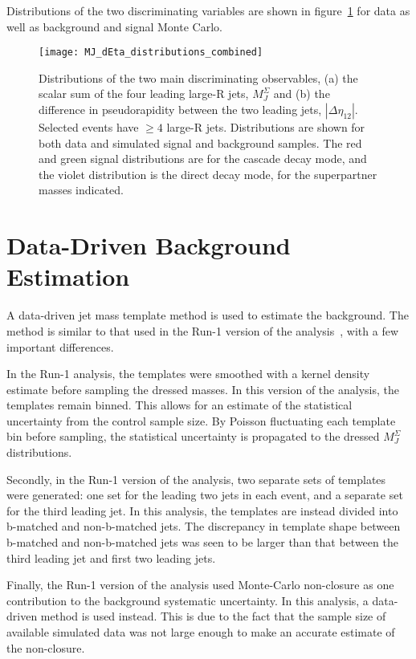 Distributions of the two discriminating variables are shown in figure~\ref{fig:MJ_dEta_distributions} for data as well as
background and signal Monte Carlo.

\begin{figure}[!ht]
    \texttt{[image: MJ\_dEta\_distributions\_combined]}
    \caption{Distributions of the two main discriminating observables, (a) the scalar sum of the four leading large-R jets, $M_{J}^{\Sigma}$ and (b) the difference in pseudorapidity between the two leading jets, $|\Delta\eta_{12}|$. Selected events have $\geq 4$ large-R jets. Distributions are shown for both data and simulated signal and background samples. The red and green signal distributions are for the cascade decay mode, and the violet distribution is the direct decay mode, for the superpartner masses indicated.}
    \label{fig:MJ_dEta_distributions}
\end{figure}

\section{Data-Driven Background Estimation} \label{sec:bkg_estimation}
A data-driven jet mass template method is used to estimate the background.
The method is similar to that used in the Run-1 version of the analysis~\cite{run1-multijet}, with a few important differences.

In the Run-1 analysis, the templates were smoothed with a kernel density estimate before sampling the dressed masses.
In this version of the analysis, the templates remain binned.
This allows for an estimate of the statistical uncertainty from the control sample size.
By Poisson fluctuating each template bin before sampling, the statistical uncertainty is propagated to the dressed $M_J^{\Sigma}$ distributions.

Secondly, in the Run-1 version of the analysis, two separate sets of templates were generated: one set for the leading two jets in each event,
and a separate set for the third leading jet.
In this analysis, the templates are instead divided into b-matched and non-b-matched jets.
The discrepancy in template shape between b-matched and non-b-matched jets was seen to be larger than that between the third leading jet and first two leading jets.

Finally, the Run-1 version of the analysis used Monte-Carlo non-closure as one contribution to the background systematic uncertainty.
In this analysis, a data-driven method is used instead.
This is due to the fact that the sample size of available simulated data was not large enough to make an accurate estimate of the non-closure.

